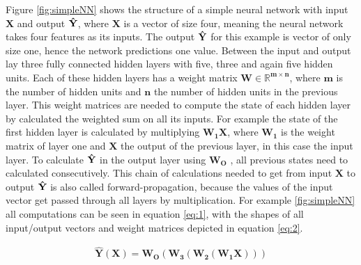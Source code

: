 Figure \ref{fig:simpleNN} shows the structure of a simple neural network with input $\mathbf{X}$ and output $\mathbf{\Hat{Y}}$, where $\mathbf{X}$ is a vector of size four, meaning the neural network takes four features as its inputs. 
The output $\mathbf{\Hat{Y}}$ for this example is vector of only size one, hence the network predictions one value.
Between the input and output lay three fully connected hidden layers with five, three and again five hidden units.
Each of these hidden layers has a weight matrix $\mathbf{W\in\mathbb{R}^{m\times n}}$, where $\mathbf{m}$ is the number of hidden units and $\mathbf{n}$ the number of hidden units in the previous layer.
This weight matrices are needed to compute the state of each hidden layer by calculated the weighted sum on all its inputs.
For example the state of the first hidden layer is calculated by multiplying $\mathbf{W_1X}$, where $\mathbf{W_1}$ is the weight matrix of layer one and $\mathbf{X}$ the output of the previous layer, in this case the input layer.
To calculate  $\mathbf{\Hat{Y}}$ in the output layer using $\mathbf{W_O}$ , all previous states need to calculated consecutively. 
This chain of calculations needed to get from input $\mathbf{X}$ to output $\mathbf{\Hat{Y}}$ is also called forward-propagation, because the values of the input vector get passed through all layers by multiplication.
For example \ref{fig:simpleNN} all computations can be seen in equation \ref{eq:1}, with the shapes of all input/output vectors and weight matrices depicted in equation \ref{eq:2}.

\begin{equation} \label{eq:1}
\begin{gathered}
\mathbf{\hat{Y}(X)} = \mathbf{W_O(W_3(W_2(W_1X)))}
\end{gathered}
\end{equation}



